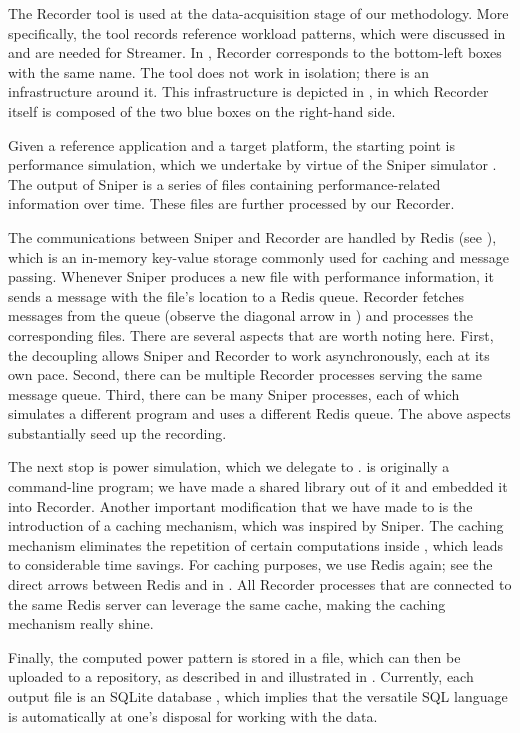 
The Recorder tool is used at the data-acquisition stage of our methodology. More
specifically, the tool records reference workload patterns, which were discussed
in  and are needed for Streamer. In , Recorder
corresponds to the bottom-left boxes with the same name. The tool does not work
in isolation; there is an infrastructure around it. This infrastructure is
depicted in , in which Recorder itself is composed of the two
blue boxes on the right-hand side.

Given a reference application and a target platform, the starting point is
performance simulation, which we undertake by virtue of the Sniper simulator
\cite{carlson2011}. The output of Sniper is a series of files containing
performance-related information over time. These files are further processed by
our Recorder.

The communications between Sniper and Recorder are handled by Redis \cite{redis}
(see ), which is an in-memory key-value storage commonly used for
caching and message passing. Whenever Sniper produces a new file with
performance information, it sends a message with the file's location to a Redis
queue. Recorder fetches messages from the queue (observe the diagonal arrow in
) and processes the corresponding files. There are several
aspects that are worth noting here. First, the decoupling allows Sniper and
Recorder to work asynchronously, each at its own pace. Second, there can be
multiple Recorder processes serving the same message queue. Third, there can be
many Sniper processes, each of which simulates a different program and uses a
different Redis queue. The above aspects substantially seed up the recording.

The next stop is power simulation, which we delegate to 
\cite{li2009}.  is originally a command-line program; we have made a
shared library out of it and embedded it into Recorder. Another important
modification that we have made to  is the introduction of a caching
mechanism, which was inspired by Sniper. The caching mechanism eliminates the
repetition of certain computations inside , which leads to
considerable time savings. For caching purposes, we use Redis again; see the
direct arrows between Redis and  in . All Recorder
processes that are connected to the same Redis server can leverage the same
cache, making the caching mechanism really shine.

Finally, the computed power pattern is stored in a file, which can then be
uploaded to a repository, as described in  and illustrated in
. Currently, each output file is an SQLite database
\cite{sqlite}, which implies that the versatile SQL language is automatically at
one's disposal for working with the data.
